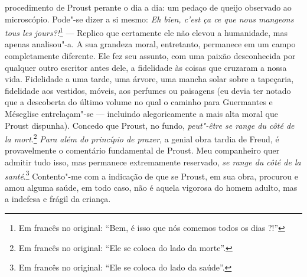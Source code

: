 procedimento de Proust perante o dia a dia: um pedaço de queijo
observado ao microscópio. Pode"-se dizer a si mesmo: \emph{Eh bien, c'est
ça ce que nous mangeons tous les jours?!}\footnote{Em francês no original: ``Bem, é isso
  que nós comemos todos os dias ?!'' \versal{[N. T.]}} --- Replico
que certamente ele não elevou a humanidade, mas apenas analisou"-a. A sua
grandeza moral, entretanto, permanece em um campo completamente
diferente. Ele fez seu assunto, com uma paixão desconhecida por qualquer
outro escritor antes dele, a fidelidade às coisas que cruzaram a nossa
vida. Fidelidade a uma tarde, uma árvore, uma mancha solar sobre a
tapeçaria, fidelidade aos vestidos, móveis, aos perfumes ou paisagens
(eu devia ter notado que a descoberta do último volume no qual o caminho
para Guermantes e Méseglise entrelaçam"-se --- incluindo alegoricamente a
mais alta moral que Proust dispunha). Concedo que Proust, no fundo,
\emph{peut"-être se range du côté de la mort}.\footnote{Em francês no original: ``Ele se
  coloca do lado da morte''. \versal{[N. T.]}} \emph{Para além
do princípio de prazer}, a genial obra tardia de Freud, é provavelmente
o comentário fundamental de Proust. Meu companheiro quer admitir tudo
isso, mas permanece extremamente reservado, \emph{se range du côté de la
santé}.\footnote{Em francês no original: ``Ele se coloca do lado da
  saúde''. \versal{[N. T.]}} Contento"-me com a indicação de que
se Proust, em sua obra, procurou e amou alguma saúde, em todo caso,
não é aquela vigorosa do homem adulto, mas a indefesa e frágil da
criança.


